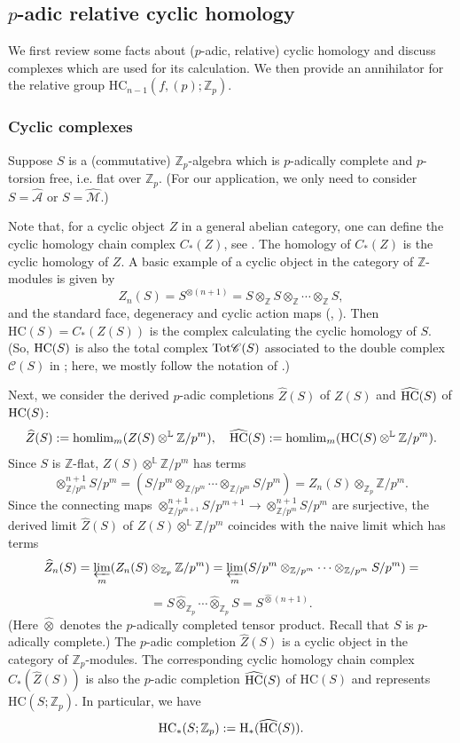 \documentclass[reqno,11pt,letterpaper]{amsart}
\theoremstyle{plain}
\numberwithin{equation}{subsection}
\theoremstyle{remark}
\theoremstyle{plain}
\theoremstyle{definition}\newtheorem*{notation}{Notation}
\newcommand{\A}{{\mathcal A}}
\newcommand{\Z}{{\mathbb Z}}
\newcommand{\M}{{\mathcal M}}
\newcommand{\BL}{{\mathbb {L}}}
\newcommand{\BZ}{\mathbb{Z}}
\newcommand{\HC}{\mathrm{HC}}
\newcommand{\wh}{\widehat}
\begin{document}
 

\subsection{$p$-adic relative   cyclic homology}



 We first review some facts about ($p$-adic, relative) cyclic homology and discuss complexes which are used for its calculation. We then provide an annihilator for the relative group
$\HC_{n-1}(f, (p);\Z_p)$.

\subsubsection{Cyclic complexes} 

Suppose $S$ is a (commutative) $\BZ_p$-algebra which is $p$-adically complete and $p$-torsion free, i.e. flat over $\BZ_p$.
 (For our application, we only need to consider $S=\wh \A$ or $S=\wh \M $.)

Note that, for a cyclic object $Z$ in a general abelian category, one can define the cyclic homology chain complex $C_*(Z)$, see \cite[\S I]{GoodTop}. The homology of $C_*(Z)$ is 
the cyclic homology of $Z$. A basic example of a cyclic object in the category of $\BZ$-modules is given by 
\[
Z_n(S)=S^{\otimes (n+1)}=S\otimes_{\BZ} S\otimes_{\BZ}\cdots \otimes_{\BZ}S,
\]
and the standard face, degeneracy and cyclic action maps (\cite{LQ}, \cite{GoodTop}).
Then $\HC(S)=C_*(Z(S))$ is the  complex calculating the 
cyclic homology of $S$. (So, ${\rm HC}(S)$ is also the total complex ${\rm Tot}{\mathscr C}(S)$ associated to the double complex ${\mathscr C}(S)$   in \cite{LQ}; here, we mostly follow the notation of \cite{GoodTop}.) 

Next, we consider the derived $p$-adic completions 
$\wh Z(S)$ of $Z(S)$ and $\wh{\rm HC}(S)$ of ${\rm HC}(S)$:
\[
\wh Z(S):={\rm homlim}_m (Z(S)\otimes^{\BL}\Z/p^m), \quad \wh{\rm HC}(S):={\rm homlim}_m ({\rm HC}(S)\otimes^{\BL}\Z/p^m).
\]
 Since $S$ is $\BZ$-flat,  $Z(S)\otimes^{\BL}\Z/p^m$ has terms
 \[
\otimes^{n+1}_{\BZ/p^m}S/p^m= (S/p^m\otimes_{\BZ/p^m}   \cdots \otimes_{\BZ/p^m}S/p^m)=Z_n(S)\otimes_{\Z_p}\Z/p^m.
 \]
 Since the connecting maps $\otimes^{n+1}_{\BZ/p^{m+1}}S/p^{m+1}\to \otimes^{n+1}_{\BZ/p^{m}}S/p^{m}$ are surjective, 
 the derived limit $\wh Z(S)$ of $Z(S)\otimes^{\BL}\Z/p^m$ coincides with the naive limit which has terms
 \[
\wh Z_n(S)=\varprojlim_m(Z_n(S)\otimes_{\Z_p}\Z/p^m)=\varprojlim_m(S/p^m \otimes_{\BZ/p^m}\cdots \otimes_{\BZ/p^m}S/p^m)=
\]
\[
=S\hat\otimes_{\BZ_p}\cdots \hat\otimes_{\BZ_p}S=S^{\wh\otimes (n+1)}.
\]
(Here $\wh\otimes$ denotes the $p$-adically completed tensor product. Recall  that $S$ is   $p$-adically complete.) The $p$-adic completion $\wh Z(S)$ is a cyclic object in the category of $\BZ_p$-modules. The corresponding cyclic homology chain complex $C_*(\wh Z(S))$ is   also the $p$-adic completion $\wh{{\rm {HC}}}(S)$ of $\HC(S)$ and represents $\HC(S; \BZ_p)$. In particular, we have
\[
\HC_*(S; \BZ_p):={\rm H}_*(\wh{{\rm {HC}}}(S)).
\] 
\end{document}

